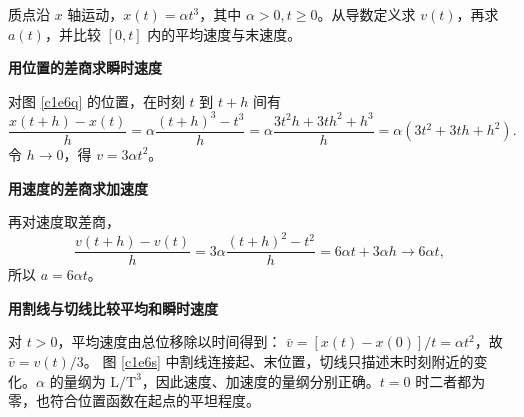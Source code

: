 \begin{question}
\begin{example}[三次位置函数]
质点沿 $x$ 轴运动，$x(t)=\alpha t^3$，其中 $\alpha>0,t\ge0$。从导数定义求 $v(t)$，再求 $a(t)$，并比较 $[0,t]$ 内的平均速度与末速度。
\end{example}
\end{question}
\begin{solution}\textbf{用位置的差商求瞬时速度}\par\nobreak
对图 \ref{c1e6q} 的位置，在时刻 $t$ 到 $t+h$ 间有
\[
 \frac{x(t+h)-x(t)}h
 =\alpha\frac{(t+h)^3-t^3}{h}
 =\alpha\frac{3t^2h+3th^2+h^3}{h}
 =\alpha(3t^2+3th+h^2).
\]
令 $h\to0$，得 $v=3\alpha t^2$。

\par\medskip{}\noindent\textbf{用速度的差商求加速度}\par\nobreak
再对速度取差商，
\[
 \frac{v(t+h)-v(t)}h
 =3\alpha\frac{(t+h)^2-t^2}{h}
 =6\alpha t+3\alpha h\longrightarrow6\alpha t,
\]
所以 $a=6\alpha t$。

\par\medskip{}\noindent\textbf{用割线与切线比较平均和瞬时速度}\par\nobreak
对 $t>0$，平均速度由总位移除以时间得到：
$\bar v=[x(t)-x(0)]/t=\alpha t^2$，故 $\bar v=v(t)/3$。
图 \ref{c1e6s} 中割线连接起、末位置，切线只描述末时刻附近的变化。$\alpha$ 的量纲为 $\mathrm L/\mathrm T^3$，因此速度、加速度的量纲分别正确。$t=0$ 时二者都为零，也符合位置函数在起点的平坦程度。
\end{solution}

